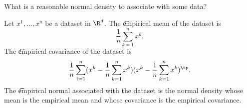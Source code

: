 
What is a reasonable normal density to associate with some data?


Let $x^1, \dots, x^n$ be a dataset in $\R^d$.
The \t{empirical mean} of the dataset is
  \[
\frac{1}{n} \sum_{k = 1}^{n} x^k.
  \]
The \t{empirical covariance} of the dataset is
  \[
\frac{1}{n} \sum_{i = 1}^{n} (x^k - \frac{1}{n} \sum_{k = 1}^{n} x^k) (x^k - \frac{1}{n} \sum_{k = 1}^{n} x^k)^{\tp}.
  \]
The \t{empirical normal} associated with the dataset is the normal density whose mean is the empirical mean and whose covariance is the empirical covariance.
